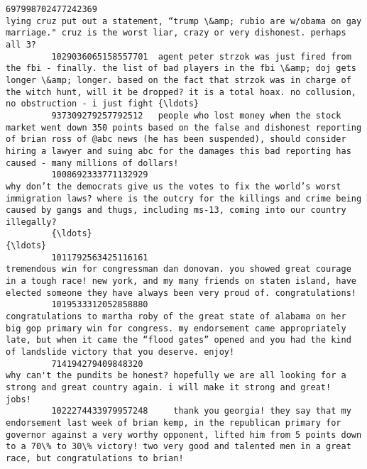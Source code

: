 \documentclass[11pt]{article}
\begin{document}
\begin{Verbatim}[commandchars=\\\{\}]
         697998702477242369                                                                                                                                          lying cruz put out a statement, “trump \&amp; rubio are w/obama on gay marriage." cruz is the worst liar, crazy or very dishonest. perhaps all 3?   
         1029036065158557701  agent peter strzok was just fired from the fbi - finally. the list of bad players in the fbi \&amp; doj gets longer \&amp; longer. based on the fact that strzok was in charge of the witch hunt, will it be dropped? it is a total hoax. no collusion, no obstruction - i just fight {\ldots}   
         937309279257792512   people who lost money when the stock market went down 350 points based on the false and dishonest reporting of brian ross of @abc news (he has been suspended), should consider hiring a lawyer and suing abc for the damages this bad reporting has caused - many millions of dollars!   
         1008692333771132929                                                                 why don’t the democrats give us the votes to fix the world’s worst immigration laws? where is the outcry for the killings and crime being caused by gangs and thugs, including ms-13, coming into our country illegally?   
         {\ldots}                                                                                                                                                                                                                                                                                                      {\ldots}   
         1011792563425116161                                                                         tremendous win for congressman dan donovan. you showed great courage in a tough race! new york, and my many friends on staten island, have elected someone they have always been very proud of. congratulations!   
         1019533312052858880                               congratulations to martha roby of the great state of alabama on her big gop primary win for congress. my endorsement came appropriately late, but when it came the “flood gates” opened and you had the kind of landslide victory that you deserve. enjoy!   
         714194279409848320                                                                                                                                               why can't the pundits be honest? hopefully we are all looking for a strong and great country again. i will make it strong and great!  jobs!   
         1022274433979957248     thank you georgia! they say that my endorsement last week of brian kemp, in the republican primary for governor against a very worthy opponent, lifted him from 5 points down to a 70\% to 30\% victory! two very good and talented men in a great race, but congratulations to brian!   

\end{Verbatim}
\end{document}
